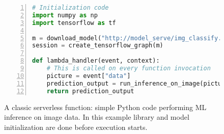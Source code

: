 \begin{figure}
  \begin{lstlisting}[language=python, numbers=left, frame=single, columns=fullflexible, label={lst:python-lambda-example}, basicstyle=\small]
# Initialization code 
import numpy as np 
import tensorflow as tf
  
m = download_model("http://model_serve/img_classify.pb")
session = create_tensorflow_graph(m) 
  
def lambda_handler(event, context):
    # This is called on every function invocation 
    picture = event["data"]
    prediction_output = run_inference_on_image(picture) 
    return prediction_output 
\end{lstlisting}
     \caption{A classic serverless function: simple Python code performing ML inference on image data. 
              In this example library and model initialization are done before execution starts.}
     \label{fig:python-lambda-example}
\end{figure}

